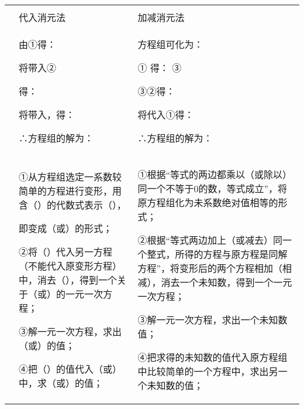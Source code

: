 \documentclass[a4paper,11pt,UTF8]{ctexart}
\begin{document}
\begin{longtable}[]{@{}lll@{}}
\toprule
\endhead
& &\tabularnewline
& 代入消元法 & 加减消元法\tabularnewline
\begin{minipage}[t]{0.30\columnwidth}\raggedright
\strut
\end{minipage} & \begin{minipage}[t]{0.30\columnwidth}\raggedright
由①得：

将带入②

得：

将带入，得：

∴方程组的解为：\strut
\end{minipage} & \begin{minipage}[t]{0.30\columnwidth}\raggedright
方程组可化为：

① 得： ③

③②得：

将代入①得：

∴方程组的解为：\strut
\end{minipage}\tabularnewline
\begin{minipage}[t]{0.30\columnwidth}\raggedright
\strut
\end{minipage} & \begin{minipage}[t]{0.30\columnwidth}\raggedright
①从方程组选定一系数较简单的方程进行变形，用含（）的代数式表示（），

即变成（或）的形式；

②将（）代入另一方程（不能代入原变形方程）中，消去（），得到一个关于（或）的一元一次方程；

③解一元一次方程，求出（或）的值；

④把（）的值代入（或）中，求（或）的值；\strut
\end{minipage} & \begin{minipage}[t]{0.30\columnwidth}\raggedright
①根据``等式的两边都乘以（或除以）同一个不等于0的数，等式成立''，将原方程组化为未系数绝对值相等的形式；

②根据``等式两边加上（或减去）同一个整式，所得的方程与原方程是同解方程''，将变形后的两个方程相加（相减），消去一个未知数，得到一个一元一次方程；

③解一元一次方程，求出一个未知数值；

④把求得的未知数的值代入原方程组中比较简单的一个方程中，求出另一个未知数的值；\strut
\end{minipage}\tabularnewline
\bottomrule
\end{longtable}
\end{document}
